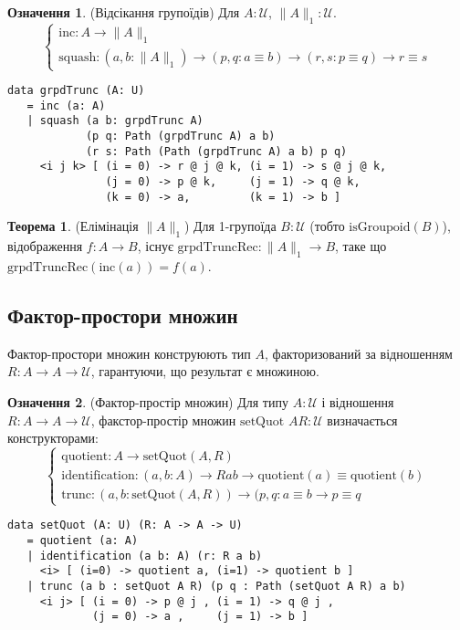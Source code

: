 \documentclass{article}
\theoremstyle{definition}
\newtheorem{theorem}{Теорема}
\newtheorem{definition}{Означення}
\begin{document}
\begin{definition} (Відсікання групоїдів)
Для \( A : \mathcal{U} \), \( \| A \|_1 : \mathcal{U} \).
\[
\begin{cases}
\text{inc} : A \to \| A \|_1 \\
\text{squash} : (a, b : \| A \|_1) \to (p, q : a \equiv b) \to (r, s : p \equiv q) \to r \equiv s
\end{cases}
\]
\begin{lstlisting}
data grpdTrunc (A: U)
   = inc (a: A)
   | squash (a b: grpdTrunc A)
            (p q: Path (grpdTrunc A) a b)
            (r s: Path (Path (grpdTrunc A) a b) p q)
     <i j k> [ (i = 0) -> r @ j @ k, (i = 1) -> s @ j @ k,
               (j = 0) -> p @ k,     (j = 1) -> q @ k,
               (k = 0) -> a,         (k = 1) -> b ]
\end{lstlisting}
\end{definition}

\begin{theorem} (Елімінація \( \| A \|_1 \))
Для 1-групоїда \( B : \mathcal{U} \) (тобто \( \text{isGroupoid}(B) \)),
відображення \( f : A \to B \), існує \( \text{grpdTruncRec} : \| A \|_1 \to B \),
таке що \( \text{grpdTruncRec}(\text{inc}(a)) = f(a) \).
\end{theorem}

\subsection{Фактор-простори множин}
Фактор-простори множин конструюють тип \( A \), факторизований за
відношенням \( R : A \to A \to \mathcal{U} \), гарантуючи, що результат є множиною.

\begin{definition} (Фактор-простір множин)
Для типу \( A : \mathcal{U} \) і відношення \( R : A \to A \to \mathcal{U} \),
факстор-простір множин \( \text{setQuot } A R : \mathcal{U} \) визначається конструкторами:
\[
\begin{cases}
\text{quotient} : A \to \text{setQuot}(A,R) \\
\text{identification} : (a, b : A) \to R a b \to \text{quotient}(a) \equiv \text{quotient}(b) \\
\text{trunc} : (a, b : \text{setQuot}(A,R)) \to (p, q : a \equiv b \to p \equiv q
\end{cases}
\]
\begin{lstlisting}
data setQuot (A: U) (R: A -> A -> U)
   = quotient (a: A)
   | identification (a b: A) (r: R a b)
     <i> [ (i=0) -> quotient a, (i=1) -> quotient b ]
   | trunc (a b : setQuot A R) (p q : Path (setQuot A R) a b)
     <i j> [ (i = 0) -> p @ j , (i = 1) -> q @ j ,
             (j = 0) -> a ,     (j = 1) -> b ]
\end{lstlisting}
\end{definition}
\end{document}
